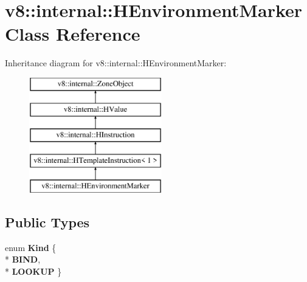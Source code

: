 \hypertarget{classv8_1_1internal_1_1_h_environment_marker}{}\section{v8\+:\+:internal\+:\+:H\+Environment\+Marker Class Reference}
\label{classv8_1_1internal_1_1_h_environment_marker}
Inheritance diagram for v8\+:\+:internal\+:\+:H\+Environment\+Marker\+:\begin{figure}[H]
\begin{center}
\leavevmode
\includegraphics[height=5.000000cm]{classv8_1_1internal_1_1_h_environment_marker}
\end{center}
\end{figure}
\subsection*{Public Types}
\begin{DoxyCompactItemize}
\item 
enum {\bfseries Kind} \{ \\*
{\bfseries B\+I\+ND}, 
\\*
{\bfseries L\+O\+O\+K\+UP}
 \}\hypertarget{classv8_1_1internal_1_1_h_environment_marker_abdad062ca7172fd7f24bf09455ca0e96}{}\label{classv8_1_1internal_1_1_h_environment_marker_abdad062ca7172fd7f24bf09455ca0e96}

\end{DoxyCompactItemize}
